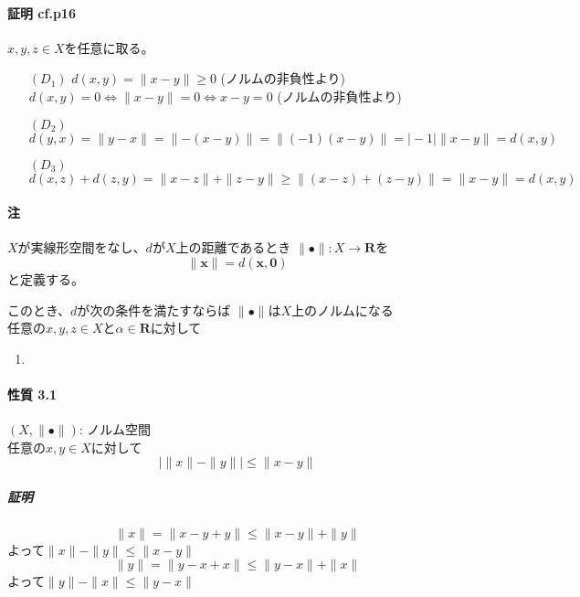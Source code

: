 \documentclass[12pt,a4paper]{article}
\begin{document}
    \paragraph{証明 cf.p16}
      $x, y, z \in X$を任意に取る。
      \begin{itemize}
        \item[$(D_1)$] $d(x, y) = \parallel x - y\parallel \geq 0$ (ノルムの非負性より) \\
          $d(x, y) = 0 \Leftrightarrow \parallel x -y \parallel = 0 \Leftrightarrow x - y = 0$ (ノルムの非負性より)
        \item[$(D_2)$]  $d(y, x) = \parallel y - x \parallel = \parallel - (x - y) \parallel = \parallel (-1) (x -y) \parallel = \mid -1 \mid \parallel x - y \parallel = d(x, y)$
        \item[$(D_3)$] $d(x, z) + d(z, y) = \parallel x - z \parallel + \parallel z - y \parallel \geq \parallel (x - z) + (z - y) \parallel = \parallel x - y \parallel = d(x, y)$
      \end{itemize}
    
    \paragraph{注}
      $X$が実線形空間をなし、$d$が$X$上の距離であるとき
      $\parallel \bullet \parallel : X \rightarrow \mathbf{R}$を
      \[\parallel \mathbf{x} \parallel = d(\mathbf{x}, \mathbf{0}) \]
      と定義する。
    
      このとき、$d$が次の条件を満たすならば
      $\parallel \bullet \parallel$は$X$上のノルムになる \\
      任意の$x, y, z \in X$と$\alpha \in \mathbf{R}$に対して
      \begin{enumerate}
        \item 
      \end{enumerate}
      
    \paragraph{性質 3.1}
      $(X, \parallel \bullet \parallel)$: ノルム空間 \\
      任意の$x,y \in X$に対して
      \[ \mid \parallel x \parallel - \parallel y \parallel \mid \leq \parallel x - y\parallel \]
    \subparagraph{証明}
      \[ \parallel x \parallel = \parallel x - y + y \parallel \leq \parallel x - y \parallel + \parallel y \parallel \]
      よって$\parallel x \parallel - \parallel y \parallel \leq \parallel x - y \parallel$\\
      \[\parallel y \parallel = \parallel y - x + x \parallel \leq \parallel y - x \parallel + \parallel x \parallel \]
      よって$\parallel y \parallel - \parallel x \parallel \leq \parallel y - x \parallel$
      
\end{document}
